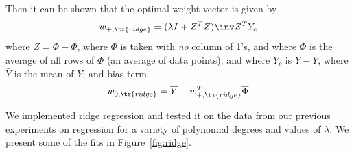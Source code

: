 \documentclass{article}
\begin{document}
\begin{multicols}{2}
Then it can be shown that the optimal weight vector is given by
\begin{equation}
\label{eq:ridge-weights}
w_{+,\tx{ridge}} = (\lambda I + Z^T Z)\inv Z^T Y_c
\end{equation}
where $Z=\Phi - \overline\Phi$, where $\Phi$ is taken with \emph{no} column of 1's, and where $\overline\Phi$ is the average of all rows of $\Phi$ (an average of data points); and where $Y_c$ is $Y - \bar Y$, where $\bar Y$ is the mean of $Y$; and bias term
\begin{equation}
\label{eq:ridge-bias}
w_{0, \tx{ridge}} = \overline Y - w_{+,\tx{ridge}}^T \overline \Phi
\end{equation}


We implemented ridge regression and tested it on the data from our previous experiments on regression for a variety of polynomial degrees and values of $\lambda$. We present some of the fits in Figure~\ref{fig:ridge}.


\end{multicols}
\end{document}
